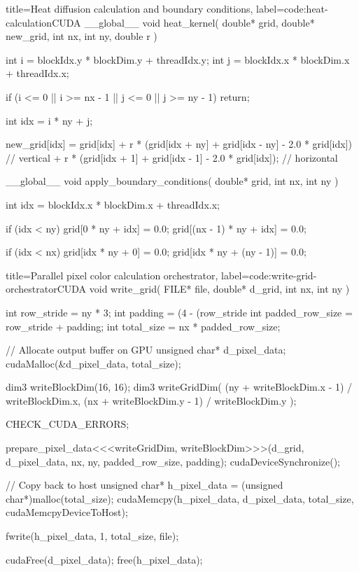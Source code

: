 \documentclass[../main.tex]{subfiles}
\begin{document}
\begin{code}{title=Heat diffusion calculation and boundary conditions, label=code:heat-calculation}{CUDA}
__global__ 
void heat_kernel(
    double* grid, 
    double* new_grid, 
    int nx, 
    int ny, 
    double r
) {
    int i = blockIdx.y * blockDim.y + threadIdx.y;
    int j = blockIdx.x * blockDim.x + threadIdx.x;

    if (i <= 0 || i >= nx - 1 || j <= 0 || j >= ny - 1) return;

    int idx = i * ny + j;

    new_grid[idx] = grid[idx]
        + r * (grid[idx + ny] + grid[idx - ny] - 2.0 * grid[idx])  // vertical
        + r * (grid[idx + 1] + grid[idx - 1] - 2.0 * grid[idx]);   // horizontal
}

__global__ 
void apply_boundary_conditions(
    double* grid, 
    int nx, 
    int ny
) {
    int idx = blockIdx.x * blockDim.x + threadIdx.x;

    if (idx < ny) {
        grid[0 * ny + idx] = 0.0;
        grid[(nx - 1) * ny + idx] = 0.0;
    }

    if (idx < nx) {
        grid[idx * ny + 0] = 0.0;
        grid[idx * ny + (ny - 1)] = 0.0;
    }
}
\end{code}

\begin{code}{title=Parallel pixel color calculation orchestrator, label=code:write-grid-orchestrator}{CUDA}
void write_grid(
    FILE* file, 
    double* d_grid, 
    int nx, 
    int ny
) {
    int row_stride = ny * 3;
    int padding = (4 - (row_stride %
    int padded_row_size = row_stride + padding;
    int total_size = nx * padded_row_size;

    // Allocate output buffer on GPU
    unsigned char* d_pixel_data;
    cudaMalloc(&d_pixel_data, total_size);

    dim3 writeBlockDim(16, 16);
    dim3 writeGridDim(
        (ny + writeBlockDim.x - 1) / writeBlockDim.x,
        (nx + writeBlockDim.y - 1) / writeBlockDim.y
    );

    CHECK_CUDA_ERRORS;

    prepare_pixel_data<<<writeGridDim, writeBlockDim>>>(d_grid, d_pixel_data, nx, ny, padded_row_size, padding);
    cudaDeviceSynchronize();

    // Copy back to host
    unsigned char* h_pixel_data = (unsigned char*)malloc(total_size);
    cudaMemcpy(h_pixel_data, d_pixel_data, total_size, cudaMemcpyDeviceToHost);

    fwrite(h_pixel_data, 1, total_size, file);

    cudaFree(d_pixel_data);
    free(h_pixel_data);
}
\end{code}
\end{document}

